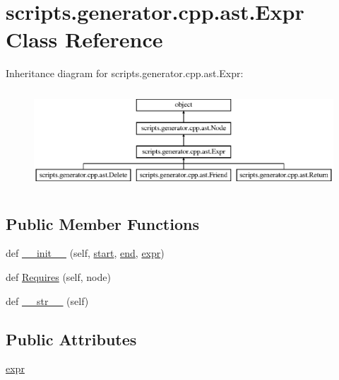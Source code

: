 \hypertarget{classscripts_1_1generator_1_1cpp_1_1ast_1_1_expr}{}\section{scripts.\+generator.\+cpp.\+ast.\+Expr Class Reference}
\label{classscripts_1_1generator_1_1cpp_1_1ast_1_1_expr}
Inheritance diagram for scripts.\+generator.\+cpp.\+ast.\+Expr\+:\begin{figure}[H]
\begin{center}
\leavevmode
\includegraphics[height=3.696370cm]{d9/d69/classscripts_1_1generator_1_1cpp_1_1ast_1_1_expr}
\end{center}
\end{figure}
\subsection*{Public Member Functions}
\begin{DoxyCompactItemize}
\item 
def \mbox{\hyperlink{classscripts_1_1generator_1_1cpp_1_1ast_1_1_expr_aa72112fc899a5d4930096272cfa71321}{\+\_\+\+\_\+init\+\_\+\+\_\+}} (self, \mbox{\hyperlink{classscripts_1_1generator_1_1cpp_1_1ast_1_1_node_a27ce0a583baee598b75ac6dd21f8575b}{start}}, \mbox{\hyperlink{classscripts_1_1generator_1_1cpp_1_1ast_1_1_node_a8e3394f9dd405352610ff9be4f284e2c}{end}}, \mbox{\hyperlink{classscripts_1_1generator_1_1cpp_1_1ast_1_1_expr_aa9a19b6b16005f4327b11e6247a9180a}{expr}})
\item 
def \mbox{\hyperlink{classscripts_1_1generator_1_1cpp_1_1ast_1_1_expr_acd51c2bd5d71002925fcdc763670b80d}{Requires}} (self, node)
\item 
def \mbox{\hyperlink{classscripts_1_1generator_1_1cpp_1_1ast_1_1_expr_a4b4a61d8f96bf3647a5e7669ed7beb5b}{\+\_\+\+\_\+str\+\_\+\+\_\+}} (self)
\end{DoxyCompactItemize}
\subsection*{Public Attributes}
\begin{DoxyCompactItemize}
\item 
\mbox{\hyperlink{classscripts_1_1generator_1_1cpp_1_1ast_1_1_expr_aa9a19b6b16005f4327b11e6247a9180a}{expr}}
\end{DoxyCompactItemize}



